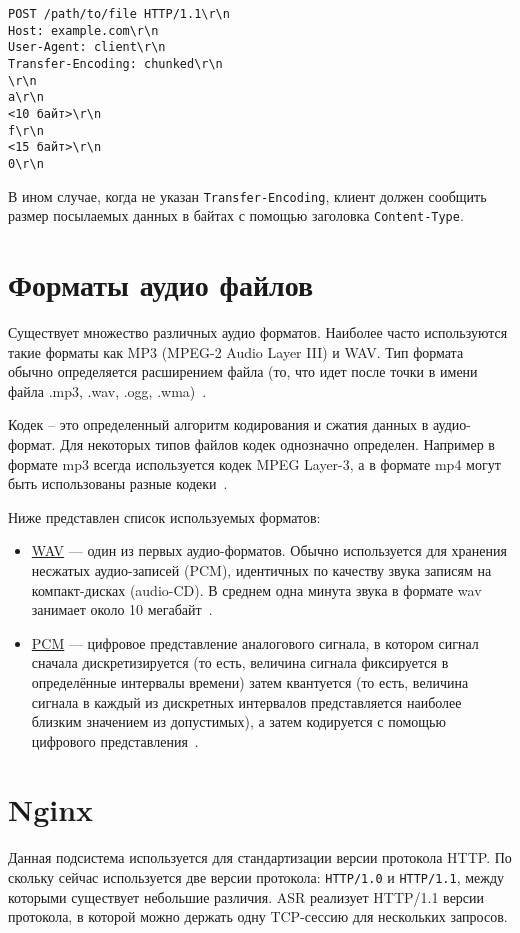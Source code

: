 \begin{lstlisting}[caption={Пример \texttt{Transfer-Encoding: chunked}}, label={lst:http:chunked}]
POST /path/to/file HTTP/1.1\r\n
Host: example.com\r\n
User-Agent: client\r\n
Transfer-Encoding: chunked\r\n
\r\n
a\r\n
<10 байт>\r\n
f\r\n
<15 байт>\r\n
0\r\n
\end{lstlisting}

В ином случае, когда не указан \texttt{Transfer-Encoding}, клиент должен \mbox{сообщить}
размер посылаемых данных в байтах с помощью заголовка \texttt{Content-Type}.

\section{Форматы аудио файлов}
Существует множество различных аудио форматов. Наиболее часто используются такие
форматы как MP3 (MPEG-2 Audio Layer III) и WAV. Тип формата обычно определяется
расширением файла (то, что идет после точки в имени файла .mp3, .wav, .ogg, .wma)~\cite{audio}.

Кодек – это определенный алгоритм кодирования и сжатия данных в аудио-формат.
Для некоторых типов файлов кодек однозначно определен. Например в формате mp3
всегда используется кодек MPEG Layer-3, а в формате mp4 могут быть использованы
разные кодеки~\cite{audio}.

Ниже представлен список используемых форматов:
\begin{itemize}
    \item \hyperlink{wav}{WAV} --– один из первых аудио-форматов. Обычно используется для хранения
    несжатых аудио-записей (PCM), идентичных по качеству звука записям на
    компакт-дисках (audio-CD). В среднем одна минута звука в формате wav занимает
    около 10 мегабайт~\cite{audio}.
    \item \hyperlink{pcm}{PCM} --- цифровое представление аналогового сигнала, в
    котором сигнал сначала дискретизируется (то есть, величина сигнала фиксируется
    в определённые интервалы времени) затем квантуется (то есть, величина сигнала
    в каждый из дискретных интервалов представляется наиболее близким значением из
    допустимых), а затем кодируется с помощью цифрового представления~\cite{pcm}.
\end{itemize}

\section{Nginx}
Данная подсистема используется для стандартизации версии протокола HTTP. По скольку
сейчас используется две версии протокола: \texttt{HTTP/1.0} и \texttt{HTTP/1.1},
между которыми существует небольшие различия. ASR реализует HTTP/1.1 версии протокола,
в которой можно держать одну TCP-сессию для нескольких запросов.

